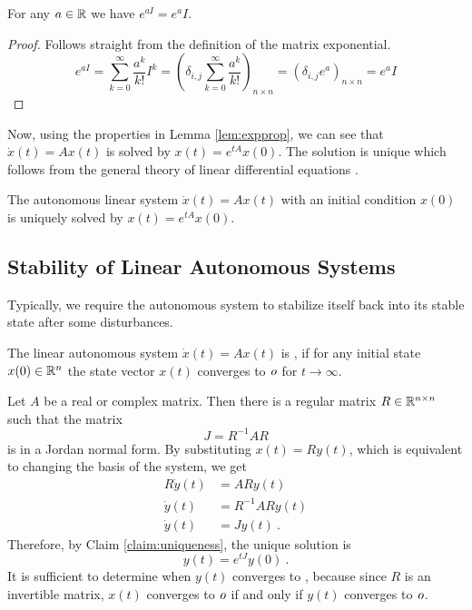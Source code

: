 \begin{lemma}
	\label{lem:matrixExpIdentity}
	For any $a\in\mathbb{R}$ we have $e^{a I}=e^{a}I$.
\end{lemma}

\begin{proof}
	Follows straight from the definition of the matrix exponential.
	$$e^{a I}=\sum^\infty_{k=0}\frac{a^k}{k!}I^k=\left(\delta_{i,j}\sum^\infty_{k=0}\frac{a^k}{k!}\right)_{n\times n}=\left(\delta_{i,j}e^a\right)_{n\times n}=e^aI$$
\end{proof}

Now, using the properties in Lemma \ref{lem:expprop}, we can see that $\dot{x}(t)=Ax(t)$ is solved by $x(t)=e^{tA}x(0)$. The solution is unique which follows from the general theory of linear differential equations \cite[see][Věta 13.5.1]{Pick}.

\begin{claim}
\label{claim:uniqueness}
	The autonomous linear system $\dot{x}(t)=Ax(t)$ with an initial condition $x(0)$ is uniquely solved by $x(t)=e^{tA}x(0)$.
\end{claim}

\subsection{Stability of Linear Autonomous Systems}

Typically, we require the autonomous system to stabilize itself back into its stable state after some disturbances.

\begin{definition}
	The linear autonomous system $\dot{x}(t)=Ax(t)$ is , if for any initial state $x(0)\in\mathbb{R}^n$ the state vector $x(t)$ converges to $\textit{o}$ for $t\to\infty$.
\end{definition}

Let $A$ be a real or complex matrix. Then there is a regular matrix $R\in \mathbb{R}^{n\times n}$ such that the matrix
$$J=R^{-1}AR$$
is in a Jordan normal form. By substituting $x(t)=Ry(t)$, which is equivalent to changing the basis of the system, we get 
\begin{align*}
	R\dot{y}(t)&=ARy(t) \\
	\dot{y}(t)&=R^{-1}ARy(t) \\
	\dot{y}(t)&=Jy(t)\ .
\end{align*}
Therefore, by Claim \ref{claim:uniqueness}, the unique solution is
$$y(t)=e^{tJ}y(0)\ .$$
It is sufficient to determine when $y(t)$ converges to \nullvector, because since $R$ is an invertible matrix, $x(t)$ converges to $\textit{o}$ if and only if $y(t)$ converges to $\textit{o}$.


